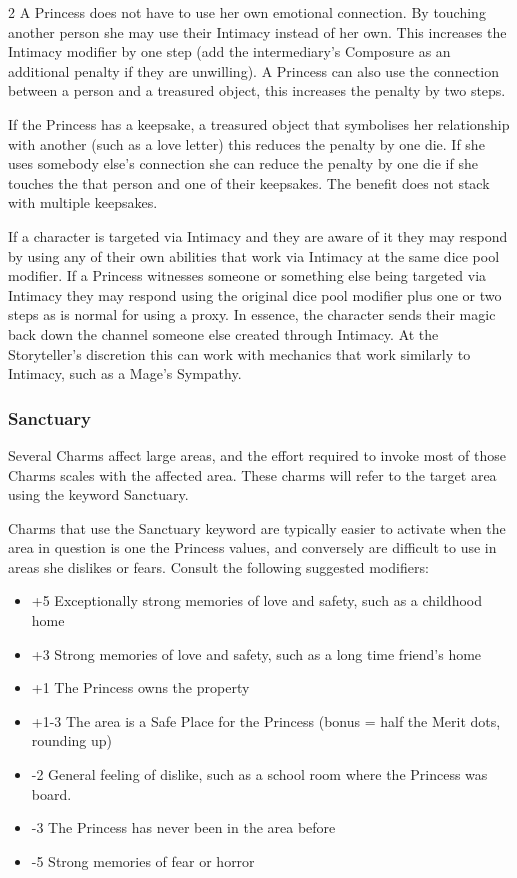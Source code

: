 \begin{multicols}{2}
A Princess does not have to use her own emotional connection. By touching another person she may use their Intimacy instead of her own. This increases the Intimacy modifier by one step (add the intermediary's Composure as an additional penalty if they are unwilling). A Princess can also use the connection between a person and a treasured object, this increases the penalty by two steps. 

If the Princess has a keepsake, a treasured object that symbolises her relationship with another (such as a love letter) this reduces the penalty by one die. If she uses somebody else's connection she can reduce the penalty by one die if she touches the that person and one of their keepsakes. The benefit does not stack with multiple keepsakes. 

If a character is targeted via Intimacy and they are aware of it they may respond by using any of their own abilities that work via Intimacy at the same dice pool modifier. If a Princess witnesses someone or something else being targeted via Intimacy they may respond using the original dice pool modifier plus one or two steps as is normal for using a proxy. In essence, the character sends their magic back down the channel someone else created through Intimacy. At the Storyteller's discretion this can work with mechanics that work similarly to Intimacy, such as a Mage's Sympathy. 

\subsubsection*{Sanctuary}

Several Charms affect large areas, and the effort required to invoke most of those Charms scales with the affected area. These charms will refer to the target area using the keyword Sanctuary. 

Charms that use the Sanctuary keyword are typically easier to activate when the area in question is one the Princess values, and conversely are difficult to use in areas she dislikes or fears. Consult the following suggested modifiers: 

\begin{itemize}
\item +5 Exceptionally strong memories of love and safety, such as a childhood home
\item +3 Strong memories of love and safety, such as a long time friend’s home
\item +1 The Princess owns the property
\item +1-3 The area is a Safe Place for the Princess (bonus = half the Merit dots, rounding up)
\item -2 General feeling of dislike, such as a school room where the Princess was board.
\item -3 The Princess has never been in the area before
\item -5 Strong memories of fear or horror
\end{itemize}



\end{multicols}

